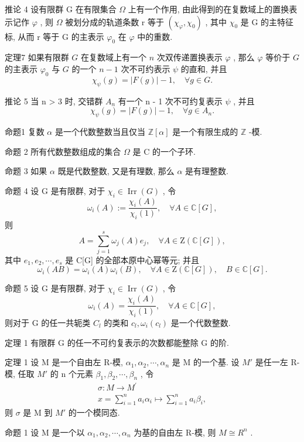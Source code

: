 \documentclass[]{article}
\begin{document}
推论 4 设有限群 G 在有限集合 $\Omega$ 上有一个作用, 由此得到的在复数域上的置换表示记作 $\varphi$ , 则 $\Omega$ 被划分成的轨道条数 r 等于 $(\chi_{\varphi}, \chi_{0})$ , 其中 $\chi_{0}$ 是 G 的主特征标, 从而 r 等于 G 的主表示 $\varphi_{0}$ 在 $\varphi$ 中的重数. 

定理7 如果有限群 $G$ 在复数域上有一个 $n$ 次双传递置换表示 $\varphi$ , 那么 $\varphi$ 等价于 $G$ 的主表示 $\varphi_0$ 与 $G$ 的一个 $n - 1$ 次不可约表示 $\psi$ 的直和, 并且 $$
\chi_ {\psi} (g) = | F (g) | - 1, \quad \forall g \in G. 
$$

推论 5 当 n > 3 时, 交错群 $A_{n}$ 有一个 n - 1 次不可约复表示 $\psi$ , 并且 $$
\chi_ {\psi} (g) = | F (g) | - 1, \quad \forall g \in A _ {n}. 
$$

命题1 复数 $\alpha$ 是一个代数整数当且仅当 $\mathbb{Z}[\alpha]$ 是一个有限生成的 $\mathbb{Z}$ -模. 

命题 2 所有代数整数组成的集合 $\Omega$ 是 C 的一个子环. 

命题 3 如果 $\alpha$ 既是代数整数, 又是有理数, 那么 $\alpha$ 是有理整数. 

命题 4 设 G 是有限群, 对于 $\chi_{i} \in \operatorname{Irr}(G)$ , 令$$
\omega_ {i} (A) := \frac {\chi_ {i} (A)}{\chi_ {i} (1)}, \quad \forall A \in \mathbb {C} [ G ],
$$
则 $$
A = \sum_ {j = 1} ^ {s} \omega_ {j} (A) e _ {j}, \quad \forall A \in \mathrm{Z} (\mathbb {C} [ G ]), 
$$其中 $e_{1}, e_{2}, \cdots, e_{s}$ 是 C[G] 的全部本原中心幂等元; 并且$$
\omega_ {i} (A B) = \omega_ {i} (A) \omega_ {i} (B), \quad \forall A \in \mathrm{Z} (\mathbb {C} [ G ]), \quad B \in \mathbb {C} [ G ]. 
$$ 

命题 5 设 G 是有限群, 对于 $\chi_{i} \in \operatorname{Irr}(G)$ , 令$$
\omega_ {i} (A) = \frac {\chi_ {i} (A)}{\chi_ {i} (1)}, \quad \forall A \in \mathbb {C} [ G ],
$$ 则对于 G 的任一共轭类 $C_{l}$ 的类和 $c_{l}, \omega_{i}(c_{l})$ 是一个代数整数. 

定理 1 有限群 G 的任一不可约复表示的次数都能整除 G 的阶. 

定理 1 设 M 是一个自由左 R-模, $\alpha_{1}, \alpha_{2}, \cdots, \alpha_{n}$ 是 M 的一个基. 设 $M'$ 是任一左 R-模, 任取 $M'$ 的 n 个元素 $\beta_{1}, \beta_{2}, \cdots, \beta_{n}$ , 令 $$
\begin{array}{c}\sigma : M \rightarrow M ^ {\prime}\\x = \sum_ {i = 1} ^ {n} a _ {i} \alpha_ {i} \mapsto \sum_ {i = 1} ^ {n} a _ {i} \beta_ {i},\end{array}
$$则 $\sigma$ 是 M 到 $M'$ 的一个模同态. 

命题 1 设 M 是一个以 $\alpha_{1}, \alpha_{2}, \cdots, \alpha_{n}$ 为基的自由左 R-模, 则 $M \cong R^{n}$ . 
\end{document}
